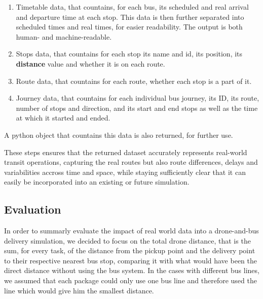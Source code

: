 \begin{enumerate}
    \item Timetable data, that countains, for each bus, its scheduled and real arrival and departure time at each stop. This data is then further separated into scheduled times and real times, for easier readability. The output is both human- and machine-readable.
    \item Stops data, that countains for each stop its name and id, its position, its \textbf{distance} value and whether it is on each route.
    \item Route data, that countains for each route, whether each stop is a part of it.
    \item Journey data, that countains for each individual bus journey, its ID, its route, number of stops and direction, and its start and end stops as well as the time at which it started and ended.
\end{enumerate} A python object that countains this data is also returned, for further use.

These steps ensures that the returned dataset accurately represents real-world transit operations, capturing the real routes but also route differences, delays and variabilities accross time and space, while staying sufficiently clear that it can easily be incorporated into an existing or future simulation.

\subsection{Evaluation}

In order to summarly evaluate the impact of real world data into a drone-and-bus delivery simulation, we decided to focus on the total drone distance, that is the sum, for every task, of the distance from the pickup point and the delivery point to their respective nearest bus stop, comparing it with what would have been the direct distance without using the bus system. In the cases with different bus lines, we assumed that each package could only use one bus line and therefore used the line which would give him the smallest distance.





